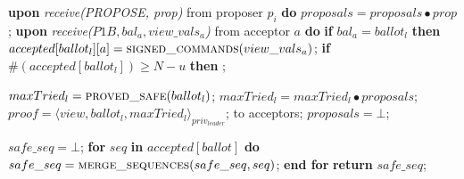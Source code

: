 \begin{algorithm}
\begin{algorithmic}[1]
		\State
		\State \textbf{upon} \textit{receive(PROPOSE, prop)} from proposer $p_i$ \textbf{do} 
		\State \hspace{\algorithmicindent} $proposals = proposals \bullet prop$;
		\State
		\State \textbf{upon} \textit{receive($P1B, bal_a,view\_vals_a$)} from acceptor $a$ \textbf{do}
		\State \hspace{\algorithmicindent} \textbf{if} $bal_a = ballot_l$ \textbf{then}
		\State \hspace{\algorithmicindent}\hspace{\algorithmicindent} $accepted[ballot_l][a] = \Call{signed\_commands}{view\_vals_a}$;
		\State \hspace{\algorithmicindent}\hspace{\algorithmicindent} \textbf{if} $\#(accepted[ballot_l]) \geq N-u$ \textbf{then} 
		\State \hspace{\algorithmicindent}\hspace{\algorithmicindent}\hspace{\algorithmicindent} ;
		
		\State
		\State $maxTried_l = \Call{proved\_safe}{ballot_l}$;
		\State $maxTried_l = maxTried_l \bullet proposals$;
		\State $proof = \langle view, ballot_l, maxTried_l \rangle_{priv_{leader}}$;
		\State {} to acceptors;
		\State $proposals = \bot$;
		\EndFunction
		
		\State
		\State $safe\_seq = \bot$;
		\State \textbf{for} $seq$ \textbf{in} $accepted[ballot]$ \textbf{do}
		\State \hspace{\algorithmicindent} $safe\_seq = \Call{merge\_sequences}{safe\_seq, seq}$;
		\State \textbf{end for}
		\State \textbf{return} $safe\_seq$;
		\EndFunction		
	\end{algorithmic}
\end{algorithm}


